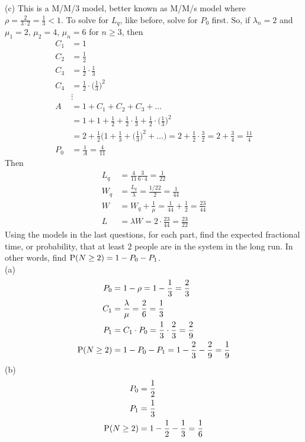 \documentclass[12pt]{article}
\begin{document}
(c) This is a M/M/3 model, better known as M/M/s model where $\rho = \frac{2}{3 \cdot 2} = \frac{1}{3} < 1$. To solve for $L_q$, like before, solve for $P_0$ first. So, if $\lambda_n = 2$ and $\mu_1 = 2$, $\mu_2 = 4$, $\mu_n = 6$ for $n\geq 3$, then $$ \begin{aligned} C_1 &= 1 \\ C_2 &= \frac{1}{2} \\ C_3 &= \frac{1}{2} \cdot \frac{1}{3} \\ C_4 &= \frac{1}{2} \cdot \Big( \frac{1}{3}\Big)^2 \\ &\vdots \\ A &= 1 + C_1 + C_2 + C_3 + \dots \\ &= 1 + 1 + \frac{1}{2} + \frac{1}{2} \cdot \frac{1}{3} + \frac{1}{2} \cdot \Big( \frac{1}{3}\Big)^2 \\ &= 2 + \frac{1}{2}\Big(1 + \frac{1}{3} + \Big( \frac{1}{3}\Big)^2 + \dots \Big) = 2 + \frac{1}{2} \cdot \frac{3}{2} = 2 + \frac{3}{4} = \frac{11}{4} \\ P_0 &= \frac{1}{A} = \frac{4}{11} \end{aligned} $$ 
Then $$ \begin{aligned} L_q &= \frac{4}{11} \frac{3}{6 \cdot 4} = \frac{1}{22} \\ W_q &= \frac{L_q}{\lambda} = \frac{1/22}{2} = \frac{1}{44} \\ W &= W_q + \frac{1}{\mu} = \frac{1}{44} + \frac{1}{2} = \frac{23}{44} \\ L &= \lambda W = 2 \cdot \frac{23}{44} = \frac{23}{22} \end{aligned} $$ 
Using the models in the last questions, for each part, find the expected fractional time, or probability, that at least $2$ people are in the system in the long run. In other words, find $\mathrm{P}( N \geq 2 ) = 1 - P_0 - P_1$. \\
(a) $$ \begin{aligned} P_0 &= 1-\rho = 1 - \frac{1}{3} = \frac{2}{3} \\ C_1 &= \frac{\lambda}{\mu} = \frac{2}{6} = \frac{1}{3} \\ P_1 &= C_1 \cdot P_0 = \frac{1}{3} \cdot \frac{2}{3} = \frac{2}{9} \\ \mathrm{P}( N \geq 2 ) &= 1 - P_0 - P_1 = 1 - \frac{2}{3} - \frac{2}{9} = \frac{1}{9} \end{aligned} $$ 
(b) $$ \begin{aligned} P_0 &= \frac{1}{2} \\ P_1 &= \frac{1}{3} \\ \mathrm{P}( N \geq 2 ) &= 1-  \frac{1}{2} - \frac{1}{3} = \frac{1}{6} \end{aligned} $$ 
\end{document}
